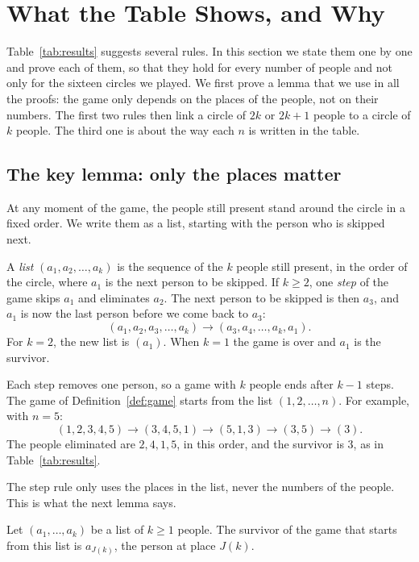 \section{What the Table Shows, and Why}

Table~\ref{tab:results} suggests several rules. In this section we state them
one by one and prove each of them, so that they hold for every number of
people and not only for the sixteen circles we played. We first prove a lemma
that we use in all the proofs: the game only depends on the places of the
people, not on their numbers. The first two rules then link a circle of $2k$
or $2k+1$ people to a circle of $k$ people. The third one is about the way
each $n$ is written in the table.

\subsection{The key lemma: only the places matter}\label{sec:tool}

At any moment of the game, the people still present stand around the circle
in a fixed order. We write them as a list, starting with the person who is
skipped next.

\begin{defi}\label{def:list}
A \emph{list} $(a_1,a_2,\dots,a_k)$ is the sequence of the $k$ people still
present, in the order of the circle, where $a_1$ is the next person to be
skipped. If $k\geq2$, one \emph{step} of the game skips $a_1$ and eliminates
$a_2$. The next person to be skipped is then $a_3$, and $a_1$ is now the last
person before we come back to $a_3$:
\[
(a_1,a_2,a_3,\dots,a_k)\longrightarrow(a_3,a_4,\dots,a_k,a_1).
\]
For $k=2$, the new list is $(a_1)$. When $k=1$ the game is over and $a_1$ is
the survivor.
\end{defi}

Each step removes one person, so a game with $k$ people ends after $k-1$
steps. The game of Definition~\ref{def:game} starts from the list
$(1,2,\dots,n)$. For example, with $n=5$:
\[
(1,2,3,4,5)\to(3,4,5,1)\to(5,1,3)\to(3,5)\to(3).
\]
The people eliminated are $2,4,1,5$, in this order, and the survivor is $3$,
as in Table~\ref{tab:results}.

The step rule only uses the places in the list, never the numbers of the
people. This is what the next lemma says.

\begin{lemma}\label{lem:places}
Let $(a_1,\dots,a_k)$ be a list of $k\geq1$ people. The survivor of the game
that starts from this list is $a_{J(k)}$, the person at place $J(k)$.
\end{lemma}

